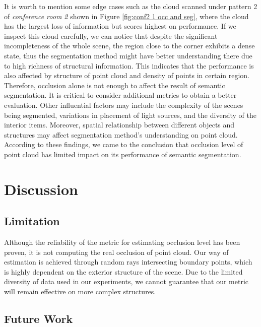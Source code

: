 \documentclass[11pt, a4paper,oneside,chapterprefix=false]{scrbook}
\begin{document}
It is worth to mention some edge cases such as the cloud scanned under pattern 2 of \emph{conference room 2} shown in Figure \ref{fig:conf2 1 occ and seg}, where the cloud has the largest loss of information but scores highest on performance. If we inspect this cloud carefully, we can notice that despite the significant incompleteness of the whole scene, the region close to the corner exhibits a dense state, thus the segmentation method might have better understanding there due to high richness of structural information. This indicates that the performance is also affected by structure of point cloud and density of points in certain region. Therefore, occlusion alone is not enough to affect the result of semantic segmentation. It is critical to consider additional metrics to obtain a better evaluation. Other influential factors may include the complexity of the scenes being segmented, variations in placement of light sources, and the diversity of the interior items. Moreover, spatial relationship between different objects and structures may affect segmentation method's understanding on point cloud. According to these findings, we came to the conclusion that occlusion level of point cloud has limited impact on its performance of semantic segmentation.

\vspace{10pt}

\section{Discussion}

\subsection{Limitation} \label{subsec:limit}


Although the reliability of the metric for estimating occlusion level has been proven, it is not computing the real occlusion of point cloud. Our way of estimation is achieved through random rays intersecting boundary points, which is highly dependent on the exterior structure of the scene. Due to the limited diversity of data used in our experiments, we cannot guarantee that our metric will remain effective on more complex structures.

\vspace{10pt}

\subsection{Future Work} \label{subsec:futurework}
\end{document}
